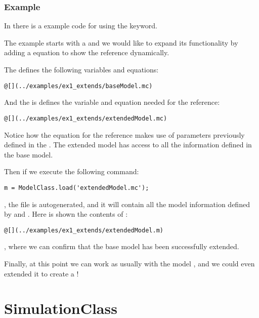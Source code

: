 \documentclass[11pt]{article}
\begin{document}
\subsubsection{Example}

In  there is a example code for using the  keyword.

The example starts with a  and we would like to expand its functionality by adding a equation to show the reference dynamically.

The  defines the following variables and equations:

\begin{lstlisting}
@[](../examples/ex1_extends/baseModel.mc)
\end{lstlisting}

And the  is defines the variable and equation needed for the reference:

\begin{lstlisting}
@[](../examples/ex1_extends/extendedModel.mc)
\end{lstlisting}

Notice how the equation for the reference  makes use of parameters previously defined in the . The extended model has access to all the information defined in the base model.

Then if we execute the following command:

\begin{lstlisting}
m = ModelClass.load('extendedModel.mc');
\end{lstlisting}

, the file  is autogenerated, and it will contain all the model information defined by  and . Here is shown the contents of :

\begin{lstlisting}
@[](../examples/ex1_extends/extendedModel.m)
\end{lstlisting}

, where we can confirm that the base model has been successfully extended.

Finally, at this point we can work as usually with the model , and we could even extended it to create a !

\section{SimulationClass}
\end{document}
